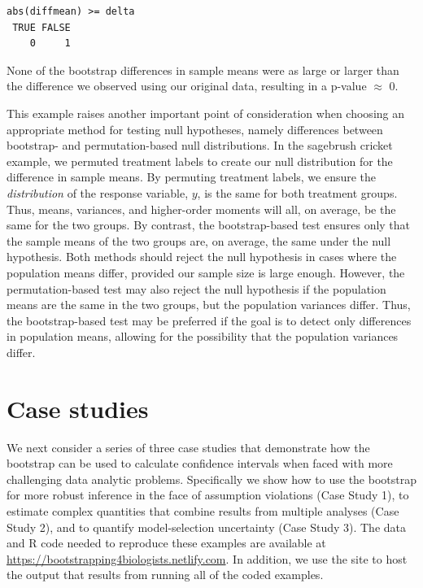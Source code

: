 \documentclass[fleqn,10pt]{wlpeerj} %
\begin{document}
\begin{verbatim}
abs(diffmean) >= delta
 TRUE FALSE 
    0     1 
\end{verbatim}

None of the bootstrap differences in sample means were as large or larger than the difference we observed using our original data, resulting in a p-value \(\approx\) 0.

This example raises another important point of consideration when choosing an appropriate method for testing null hypotheses, namely differences between bootstrap- and permutation-based null distributions. In the sagebrush cricket example, we permuted treatment labels to create our null distribution for the difference in sample means. By permuting treatment labels, we ensure the \emph{distribution} of the response variable, \(y\), is the same for both treatment groups. Thus, means, variances, and higher-order moments will all, on average, be the same for the two groups. By contrast, the bootstrap-based test ensures only that the sample means of the two groups are, on average, the same under the null hypothesis. Both methods should reject the null hypothesis in cases where the population means differ, provided our sample size is large enough. However, the permutation-based test may also reject the null hypothesis if the population means are the same in the two groups, but the population variances differ. Thus, the bootstrap-based test may be preferred if the goal is to detect only differences in population means, allowing for the possibility that the population variances differ.

\hypertarget{case-studies}{%
\section*{Case studies}\label{case-studies}}

We next consider a series of three case studies that demonstrate how the bootstrap can be used to calculate confidence intervals when faced with more challenging data analytic problems. Specifically we show how to use the bootstrap for more robust inference in the face of assumption violations (Case Study 1), to estimate complex quantities that combine results from multiple analyses (Case Study 2), and to quantify model-selection uncertainty (Case Study 3). The data and R code needed to reproduce these examples are available at \url{https://bootstrapping4biologists.netlify.com}. In addition, we use the site to host the output that results from running all of the coded examples.
\end{document}
